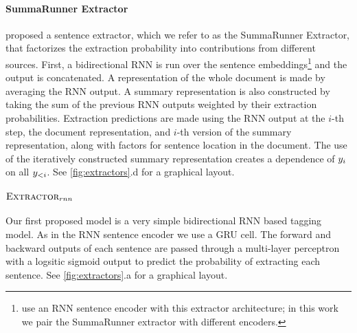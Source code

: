 
\paragraph{SummaRunner Extractor}\citet{nallapati2017summarunner} proposed
a sentence extractor, which we refer to as the SummaRunner Extractor,
that factorizes the extraction probability into contributions 
from different sources.
First, a bidirectional RNN is run over the sentence embeddings\footnote{\citet{nallapati2017summarunner}
    use an RNN sentence encoder with 
this extractor architecture; in this work we pair the SummaRunner extractor
with different encoders. } and the output is
concatenated. A representation of the whole document is made by 
averaging the RNN output. A summary representation is also constructed 
by taking the sum of the previous RNN outputs weighted by their extraction
probabilities. Extraction predictions are made using 
the RNN output at the $i$-th step, the document representation, and 
$i$-th version of the summary representation, along with factors for 
sentence location in the document. The use of the iteratively constructed
summary representation creates a dependence of $y_i$ on all $y_{<i}$.
See \autoref{fig:extractors}.d for a graphical layout.
%



\paragraph{$\textsc{Extractor}_{rnn}$}
    Our first proposed model is a very simple bidirectional
RNN based tagging model. As in the RNN sentence encoder we use a GRU cell.
The forward and backward outputs of each sentence are passed through a 
multi-layer perceptron with a logsitic sigmoid output 
to predict the probability
of extracting each sentence. 
See \autoref{fig:extractors}.a for a graphical layout.


